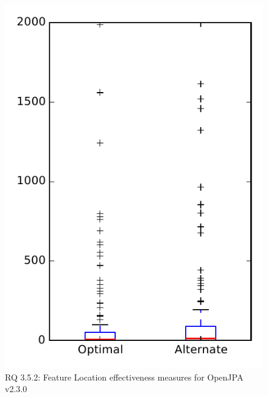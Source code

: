 
\begin{figure}
\centering
\includegraphics[height=0.4\textheight]{figures/combo/flt_rq2_openjpa}
\caption{RQ 3.5.2: Feature Location effectiveness measures for OpenJPA v2.3.0}
\label{fig:flt:rq2:openjpa}
\end{figure}
